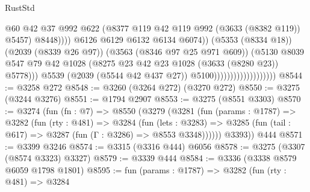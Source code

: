 \begin{lexlean}{RustStd}
\begin{coremodule}
                                                        @60
                                                        @42
                                                        @37
                                                        @992
                                                        @622
                                                        (@8377
                                                          @119
                                                          @42
                                                          @119
                                                          @992
                                                          (@3633 (@8382 @119))
                                                          @5457)
                                                        @8448))))
                                                @6126
                                                @6129
                                                @6132
                                                @6134
                                                @6074))
                                            (@5353 (@8334 @18))
                                            (@2039 (@8339 @26 @97))
                                            (@3563 (@8346 @97 @25 @971 @609))
                                            (@5130
                                              @8039
                                              @547
                                              @79
                                              @42
                                              @1028
                                              (@8275 @23 @42 @23 @1028 (@3633 (@8280 @23)) @5778)))
                                          @5539
                                          (@2039 (@5544 @42 @437 @27))
                                          @5100)))))))))))))))))))
@8544 := @3258 @272
@8548 := @3260 (@3264 @272) (@3270 @272)
@8550 := @3275 (@3244 @3276)
@8551 := @1794 @2907
@8553 := @3275 (@8551 @3303)
@8570 := @3274
    (fun (fn : @7) =>
    @8550
      (@3279
        (@3281
          (fun (params : @1787) =>
          @3282
            (fun (rty : @481) =>
            @3284
              (fun (lets : @3283) =>
              @3285 (fun (tail : @617) => @3287 (fun (Γ : @3286) => @8553 @3348))))))
        @3393))
    @444
@8571 := @3399 @3246
@8574 := @3315 (@3316 @444) @6056
@8578 := @3275 (@3307 (@8574 @3323) @3327)
@8579 := @3339 @444
@8584 := @3336 (@3338 @8579 @6059 @1798 @1801)
@8595 := fun (params : @1787) =>
  @3282
    (fun (rty : @481) =>
    @3284

\end{coremodule}
\end{lexlean}
